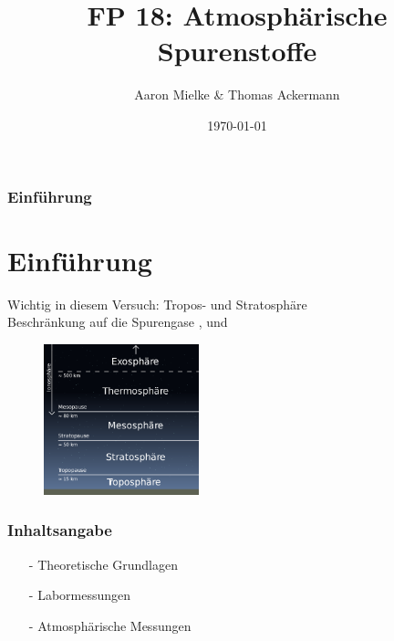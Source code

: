 \documentclass{beamer}
\title{FP 18: Atmosphärische Spurenstoffe}
\author{Aaron Mielke \& Thomas Ackermann}
\date{\today}
\begin{document}
\maketitle


\begin{frame}
	\frametitle{Einführung}
    \section{Einführung}
    Wichtig in diesem Versuch: Tropos- und Stratosphäre\\
    Beschränkung auf die Spurengase ,  und  
    \begin{figure}[h]
        \includegraphics[width=0.4\textwidth]{fig/photo/erdatmosphäre.png}
    \end{figure}
\end{frame}


\begin{frame}
    \frametitle{Inhaltsangabe}
    \begin{itemize}
        \item[-] Theoretische Grundlagen
    \vfill
		\item[-] Labormessungen
    \vfill
		\item[-] Atmosphärische Messungen 
	\end{itemize}
\end{frame}


\end{document}
